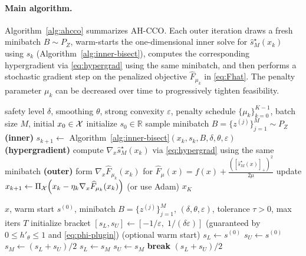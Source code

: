 \documentclass{uai2026} %
\theoremstyle{plain}
\theoremstyle{definition}
\begin{document}
\paragraph{Main algorithm.}
Algorithm~\ref{alg:ahcco} summarizes AH-CCO.
Each outer iteration draws a fresh minibatch $B\sim P_Z$, warm-starts the one-dimensional inner solve for $\widehat s_M^\star(x_k)$ using $s_k$ (Algorithm~\ref{alg:inner-bisect}), computes the corresponding hypergradient via \eqref{eq:hypergrad} using the same minibatch, and then performs a stochastic gradient step on the penalized objective $\widehat F_{\mu_k}$ in \eqref{eq:Fhat}.
The penalty parameter $\mu_k$ can be decreased over time to progressively tighten feasibility.

\begin{algorithm}[!t]
  \caption{AH-CCO: Augmented Hypergradient CCO}\label{alg:ahcco}
  \begin{algorithmic}[1]
    \Require safety level $\delta$, smoothing $\theta$, strong convexity $\varepsilon$, penalty schedule $\{\mu_k\}_{k=0}^{K-1}$, batch size $M$, initial $x_0\in\mathcal{X}$
    \State initialize $s_0\in\mathbb{R}$
      \State sample minibatch $B=\{z^{(j)}\}_{j=1}^M\sim P_Z$
      \State \textbf{(inner)} $s_{k+1}\gets$ Algorithm~\ref{alg:inner-bisect}$(x_k,s_k,B,\delta,\theta,\varepsilon)$
      \State \textbf{(hypergradient)} compute $\nabla_x \widehat s_M^\star(x_k)$ via \eqref{eq:hypergrad} using the same minibatch
      \State \textbf{(outer)} form $\nabla_x \widehat F_{\mu_k}(x_k)$ for $\widehat F_{\mu}(x)=f(x)+\frac{([\widehat s_M^\star(x)]_+)^2}{2\mu}$
      \State update $x_{k+1}\leftarrow \Pi_{\mathcal{X}}\!\left(x_k - \eta_k \nabla_x \widehat F_{\mu_k}(x_k)\right)$ (or use Adam)
    \EndFor
    \State \Return $x_K$
  \end{algorithmic}
\end{algorithm}

\begin{algorithm}[!t]
  \caption{Inner-loop bisection for $\widehat s_M^\star(x)$}\label{alg:inner-bisect}
  \begin{algorithmic}[1]
    \Require $x$, warm start $s^{(0)}$, minibatch $B=\{z^{(j)}\}_{j=1}^M$, $(\delta,\theta,\varepsilon)$, tolerance $\tau>0$, max iters $T$
    \State initialize bracket $[s_L,s_U]\gets[-1/\varepsilon,\;1/(\delta\varepsilon)]$ \hfill (guaranteed by $0\le h'_\theta\le 1$ and \eqref{eq:phi-plugin})
     \hfill (optional warm start)
       \State $s_L\gets s^{(0)}$ \Else \State $s_U\gets s^{(0)}$ \EndIf
    \EndIf
      \State $s_M \gets (s_L+s_U)/2$
       \State $s_L \gets s_M$ \Else \State $s_U \gets s_M$ \EndIf
       \State \textbf{break} \EndIf
    \EndFor
    \State \Return $(s_L+s_U)/2$
  \end{algorithmic}
\end{algorithm}
\end{document}
